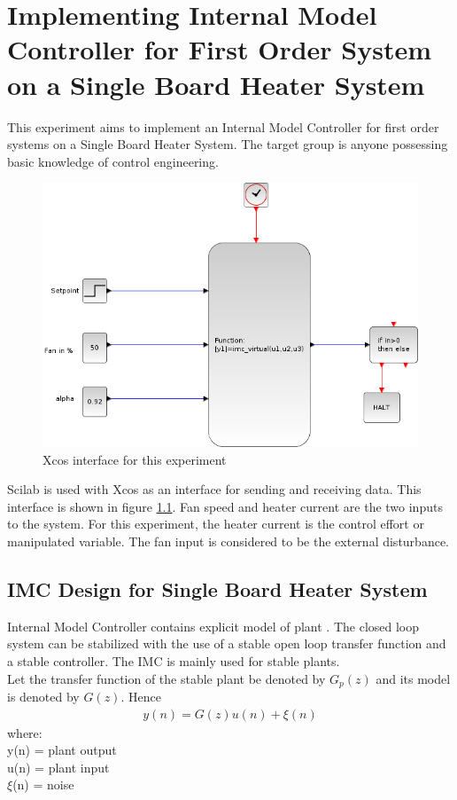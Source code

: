 \chapter{Implementing Internal Model Controller for First Order System on a Single Board Heater System}
This experiment aims to implement an Internal Model Controller for first order systems on a Single Board Heater System. 
The target group is anyone possessing basic knowledge of control engineering.\\
\begin{figure}
	\centering
		\includegraphics[width=\linewidth]{IMC/imc_virtual_xcos.png}
	\caption{Xcos interface for this experiment}
	\label{Xcos_imc}
\end{figure}
Scilab is used with Xcos as an interface for sending and receiving data. 
This interface is shown in figure \ref{Xcos_imc}. Fan speed and heater current are the two inputs to the system. 
For this experiment, the heater current is the control effort or manipulated variable. 
The fan input is considered to be the external disturbance.

\section{IMC Design for Single Board Heater System}
Internal Model Controller contains explicit model of plant \cite{kmmdc09}. 
The closed loop system can be stabilized with the use of a stable open loop transfer function and a stable controller. 
The IMC is mainly used for stable plants.\\

Let the transfer function of the stable plant be denoted by $G_p (z)$ and its model is denoted by $G(z)$. Hence
\begin{align}
y(n) = G(z)u(n)+\xi(n) 
\end{align}
where: \\
y(n) = plant output\\
      u(n) = plant input\\
      $\xi$(n) = noise
      
